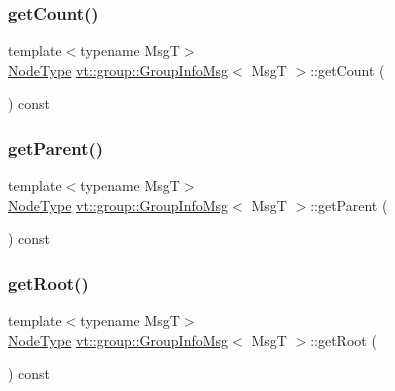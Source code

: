 \subsubsection{\texorpdfstring{get\+Count()}{getCount()}}
{\footnotesize\ttfamily template$<$typename MsgT$>$ \\
\hyperlink{namespacevt_a866da9d0efc19c0a1ce79e9e492f47e2}{Node\+Type} \hyperlink{structvt_1_1group_1_1_group_info_msg}{vt\+::group\+::\+Group\+Info\+Msg}$<$ MsgT $>$\+::get\+Count (\begin{DoxyParamCaption}{ }\end{DoxyParamCaption}) const\hspace{0.3cm}{\ttfamily [inline]}}

\mbox{\label{structvt_1_1group_1_1_group_info_msg_a46affd5f499b8de1336c21f7e044b4d2}} 
\subsubsection{\texorpdfstring{get\+Parent()}{getParent()}}
{\footnotesize\ttfamily template$<$typename MsgT$>$ \\
\hyperlink{namespacevt_a866da9d0efc19c0a1ce79e9e492f47e2}{Node\+Type} \hyperlink{structvt_1_1group_1_1_group_info_msg}{vt\+::group\+::\+Group\+Info\+Msg}$<$ MsgT $>$\+::get\+Parent (\begin{DoxyParamCaption}{ }\end{DoxyParamCaption}) const\hspace{0.3cm}{\ttfamily [inline]}}

\mbox{\label{structvt_1_1group_1_1_group_info_msg_a9c7a80de634653780f854d80a2b3cc7c}} 
\subsubsection{\texorpdfstring{get\+Root()}{getRoot()}}
{\footnotesize\ttfamily template$<$typename MsgT$>$ \\
\hyperlink{namespacevt_a866da9d0efc19c0a1ce79e9e492f47e2}{Node\+Type} \hyperlink{structvt_1_1group_1_1_group_info_msg}{vt\+::group\+::\+Group\+Info\+Msg}$<$ MsgT $>$\+::get\+Root (\begin{DoxyParamCaption}{ }\end{DoxyParamCaption}) const\hspace{0.3cm}{\ttfamily [inline]}}

